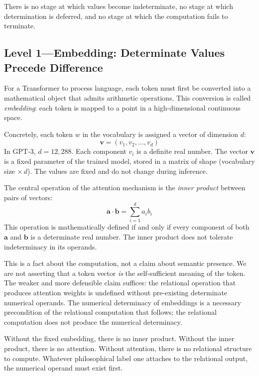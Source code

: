 \documentclass[a4paper,twocolumn,11pt]{article}
\begin{document}
There is no stage at which values become indeterminate, no stage at which determination is deferred, and no stage at which the computation fails to terminate.

\subsection{Level 1---Embedding: Determinate Values Precede Difference}
\label{sec:embedding}

For a Transformer to process language, each token must first be converted into a mathematical object that admits arithmetic operations. This conversion is called \emph{embedding}: each token is mapped to a point in a high-dimensional continuous space.

Concretely, each token $w$ in the vocabulary is assigned a vector of dimension $d$:
\begin{equation}
\mathbf{v} = (v_1, v_2, \ldots, v_d)
\end{equation}
In GPT-3, $d = 12{,}288$. Each component $v_i$ is a definite real number. The vector $\mathbf{v}$ is a fixed parameter of the trained model, stored in a matrix of shape (vocabulary size $\times\, d$). The values are fixed and do not change during inference.

The central operation of the attention mechanism is the \emph{inner product} between pairs of vectors:
\begin{equation}
\mathbf{a} \cdot \mathbf{b} = \sum_{i=1}^{d} a_i b_i
\end{equation}
This operation is mathematically defined if and only if every component of both $\mathbf{a}$ and $\mathbf{b}$ is a determinate real number. The inner product does not tolerate indeterminacy in its operands.

This is a fact about the computation, not a claim about semantic presence. We are not asserting that a token vector \emph{is} the self-sufficient meaning of the token. The weaker and more defensible claim suffices: the relational operation that produces attention weights is undefined without pre-existing determinate numerical operands. The numerical determinacy of embeddings is a necessary precondition of the relational computation that follows; the relational computation does not produce the numerical determinacy.

Without the fixed embedding, there is no inner product. Without the inner product, there is no attention. Without attention, there is no relational structure to compute. Whatever philosophical label one attaches to the relational output, the numerical operand must exist first.
\end{document}
